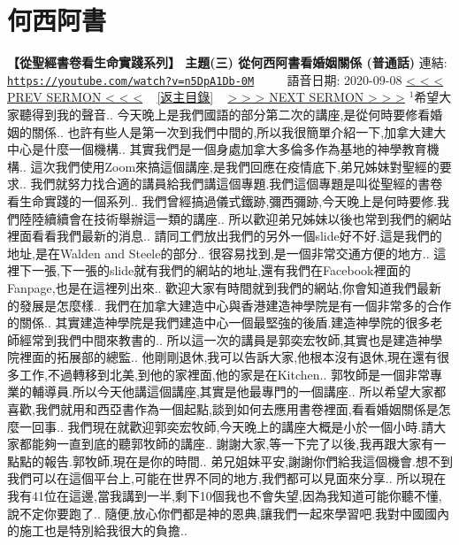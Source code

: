 \documentclass{book}
\begin{document}
\section{何西阿書}
\label{sec:n5DpA1Db_0M}
\textbf{【從聖經書卷看生命實踐系列】 主題(三) 從何西阿書看婚姻關係 (普通話)}
\newline
\newline
連結: \href{https://youtube.com/watch?v=n5DpA1Db-0M}{\texttt{https://youtube.com/watch?v=n5DpA1Db-0M}} ~~~~ 語音日期: 2020-09-08
\newline
\newline
\hyperref[sec:XLKUZGl9ItY]{\small{< < < PREV SERMON < < <}}
~
\hyperref[sec:index]{\small{[返主目錄]}}
~
\hyperref[sec:DOwKowWHLkM]{\small{> > > NEXT SERMON > > >}}
\newline
\newline
$^{1}$希望大家聽得到我的聲音..
今天晚上是我們國語的部分第二次的講座,是從何時要修看婚姻的關係..
也許有些人是第一次到我們中間的,所以我很簡單介紹一下,加拿大建大中心是什麼一個機構..
其實我們是一個身處加拿大多倫多作為基地的神學教育機構..
這次我們使用Zoom來搞這個講座,是我們回應在疫情底下,弟兄姊妹對聖經的要求..
我們就努力找合適的講員給我們講這個專題.我們這個專題是叫從聖經的書卷看生命實踐的一個系列..
我們曾經搞過儀式鐵跡,彌西彌跡,今天晚上是何時要修.我們陸陸續續會在技術舉辦這一類的講座..
所以歡迎弟兄姊妹以後也常到我們的網站裡面看看我們最新的消息..
請同工們放出我們的另外一個slide好不好.這是我們的地址,是在Walden and Steele的部分..
很容易找到,是一個非常交通方便的地方..
這裡下一張,下一張的slide就有我們的網站的地址,還有我們在Facebook裡面的Fanpage,也是在這裡列出來..
歡迎大家有時間就到我們的網站,你會知道我們最新的發展是怎麼樣..
我們在加拿大建造中心與香港建造神學院是有一個非常多的合作的關係..
其實建造神學院是我們建造中心一個最堅強的後盾.建造神學院的很多老師經常到我們中間來教書的..
所以這一次的講員是郭奕宏牧師,其實也是建造神學院裡面的拓展部的總監..
他剛剛退休,我可以告訴大家,他根本沒有退休,現在還有很多工作,不過轉移到北美,到他的家裡面,他的家是在Kitchen..
郭牧師是一個非常專業的輔導員.所以今天他講這個講座,其實是他最專門的一個講座..
所以希望大家都喜歡,我們就用和西亞書作為一個起點,談到如何去應用書卷裡面,看看婚姻關係是怎麼一回事..
我們現在就歡迎郭奕宏牧師,今天晚上的講座大概是小於一個小時.請大家都能夠一直到底的聽郭牧師的講座..
謝謝大家,等一下完了以後,我再跟大家有一點點的報告.郭牧師,現在是你的時間..
弟兄姐妹平安,謝謝你們給我這個機會.想不到我們可以在這個平台上,可能在世界不同的地方,我們都可以見面來分享..
所以現在我有41位在這邊,當我講到一半,剩下10個我也不會失望,因為我知道可能你聽不懂,說不定你要跑了..
隨便,放心你們都是神的恩典,讓我們一起來學習吧.我對中國國內的施工也是特別給我很大的負擔..
\end{document}

